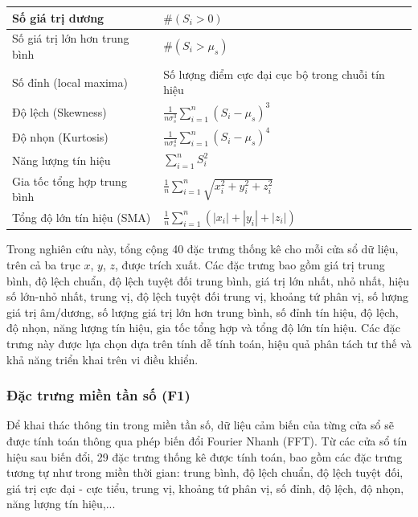 \begin{table}[H]
\begin{center}
\begin{tabular}{|l|p{9.5cm}|}
            \hline
            Số giá trị dương              & $\#(S_i > 0)$                                                      \\
            \hline
            Số giá trị lớn hơn trung bình & $\#(S_i > \mu_s)$                                                  \\
            \hline
            Số đỉnh (local maxima)        & Số lượng điểm cực đại cục bộ trong chuỗi tín hiệu                  \\
            \hline
            Độ lệch (Skewness)            & $\frac{1}{n \sigma_s^3} \sum_{i=1}^{n} (S_i - \mu_s)^3$            \\
            \hline
            Độ nhọn (Kurtosis)            & $\frac{1}{n \sigma_s^4} \sum_{i=1}^{n} (S_i - \mu_s)^4$            \\
            \hline
            Năng lượng tín hiệu           & $\sum_{i=1}^{n} S_i^2$                                             \\
            \hline
            Gia tốc tổng hợp trung bình   & $\frac{1}{n} \sum_{i=1}^{n} \sqrt{x_i^2 + y_i^2 + z_i^2}$          \\
            \hline
            Tổng độ lớn tín hiệu (SMA)    & $\frac{1}{n} \sum_{i=1}^{n} (|x_i| + |y_i| + |z_i|)$               \\
            \hline
        \end{tabular}
    \end{center}
\end{table}
Trong nghiên
cứu này, tổng cộng 40 đặc trưng thống kê cho mỗi cửa sổ dữ liệu, trên cả ba
trục $x$, $y$, $z$, được trích xuất. Các đặc trưng bao gồm giá trị trung bình,
độ lệch chuẩn, độ lệch tuyệt đối trung bình, giá trị lớn nhất, nhỏ nhất, hiệu
số lớn-nhỏ nhất, trung vị, độ lệch tuyệt đối trung vị, khoảng tứ phân vị, số
lượng giá trị âm/dương, số lượng giá trị lớn hơn trung bình, số đỉnh tín hiệu,
độ lệch, độ nhọn, năng lượng tín hiệu, gia tốc tổng hợp và tổng độ lớn tín
hiệu. Các đặc trưng này được lựa chọn dựa trên tính dễ tính toán, hiệu quả phân
tách tư thế và khả năng triển khai trên vi điều khiển.

\subsubsection{Đặc trưng miền tần số (F1)}\label{AA}

Để khai thác thông tin trong miền tần số, dữ liệu cảm biến của từng cửa sổ sẽ được
tính toán thông qua phép biến đổi
Fourier Nhanh (FFT).
Từ các cửa sổ tín hiệu sau biến đổi, 29 đặc trưng thống kê được tính toán,
bao gồm các đặc trưng tương tự như trong miền thời gian: trung bình,
độ lệch chuẩn, độ lệch tuyệt đối, giá trị cực đại - cực tiểu,
trung vị, khoảng tứ phân vị, số đỉnh, độ lệch, độ nhọn, năng lượng tín
hiệu,...

